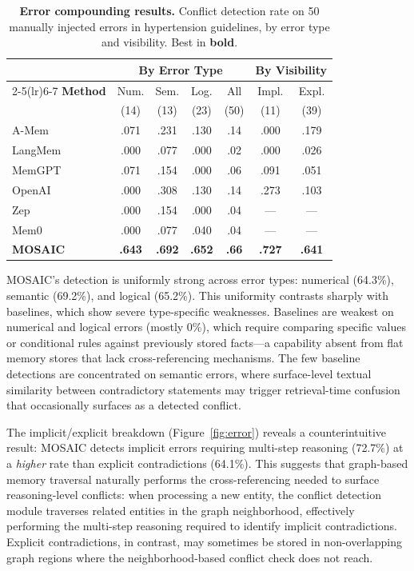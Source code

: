 \documentclass[10pt,twocolumn]{article}
\begin{document}
\begin{table}[!t]
\centering
\caption{\textbf{Error compounding results.} Conflict detection rate on 50
manually injected errors in hypertension guidelines, by error type and
visibility. Best in \textbf{bold}.}
\label{tab:error}
\small
\setlength{\tabcolsep}{3pt}
\begin{tabular}{@{}lcccc cc@{}}
\toprule
& \multicolumn{4}{c}{\textbf{By Error Type}} &
  \multicolumn{2}{c}{\textbf{By Visibility}} \\
\cmidrule(lr){2-5}\cmidrule(lr){6-7}
\textbf{Method} & Num. & Sem. & Log. & All & Impl. & Expl. \\
& (14) & (13) & (23) & (50) & (11) & (39) \\
\midrule
A-Mem   & .071 & .231 & .130 & .14 & .000 & .179 \\
LangMem & .000 & .077 & .000 & .02 & .000 & .026 \\
MemGPT  & .071 & .154 & .000 & .06 & .091 & .051 \\
OpenAI  & .000 & .308 & .130 & .14 & .273 & .103 \\
Zep     & .000 & .154 & .000 & .04 & ---  & ---  \\
Mem0    & .000 & .077 & .040 & .04 & ---  & ---  \\
\midrule
\textbf{MOSAIC} & \textbf{.643} & \textbf{.692} & \textbf{.652} & \textbf{.66}
  & \textbf{.727} & \textbf{.641} \\
\bottomrule
\end{tabular}
\end{table}

MOSAIC's detection is uniformly strong across error types: numerical
(64.3\%), semantic (69.2\%), and logical (65.2\%). This uniformity contrasts
sharply with baselines, which show severe type-specific weaknesses. Baselines
are weakest on numerical and logical errors (mostly 0\%), which require
comparing specific values or conditional rules against previously stored
facts---a capability absent from flat memory stores that lack
cross-referencing mechanisms. The few baseline detections are concentrated
on semantic errors, where surface-level textual similarity between
contradictory statements may trigger retrieval-time confusion that
occasionally surfaces as a detected conflict.

The implicit/explicit breakdown (Figure~\ref{fig:error}) reveals a
counterintuitive result: MOSAIC detects implicit errors requiring multi-step
reasoning (72.7\%) at a \emph{higher} rate than explicit contradictions
(64.1\%). This suggests that graph-based memory traversal naturally performs
the cross-referencing needed to surface reasoning-level conflicts: when
processing a new entity, the conflict detection module traverses related
entities in the graph neighborhood, effectively performing the multi-step
reasoning required to identify implicit contradictions. Explicit
contradictions, in contrast, may sometimes be stored in non-overlapping
graph regions where the neighborhood-based conflict check does not reach.
\end{document}

